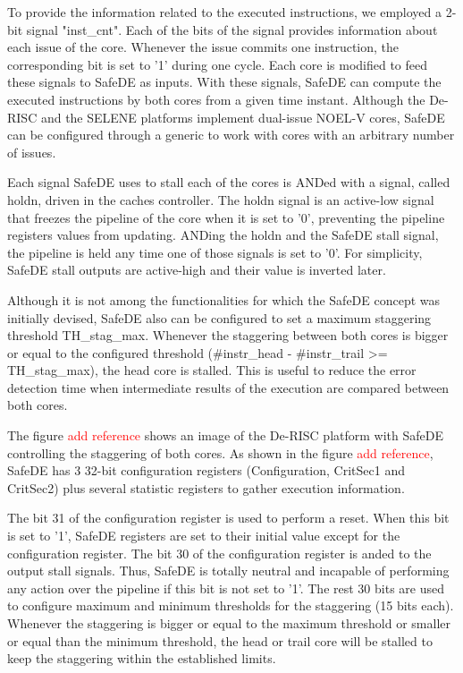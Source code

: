 To provide the information related to the executed instructions, we employed a 2-bit signal "inst\_cnt". Each of the bits of the signal provides information about each issue of the core. Whenever the issue commits one instruction, the corresponding bit is set to '1' during one cycle. Each core is modified to feed these signals to SafeDE as inputs. With these signals, SafeDE can compute the executed instructions by both cores from a given time instant. Although the De-RISC and the SELENE platforms implement dual-issue NOEL-V cores, SafeDE can be configured through a generic to work with cores with an arbitrary number of issues. 

Each signal SafeDE uses to stall each of the cores is ANDed with a signal, called holdn, driven in the caches controller. The holdn signal is an active-low signal that freezes the pipeline of the core when it is set to '0', preventing the pipeline registers values from updating. ANDing the holdn and the SafeDE stall signal, the pipeline is held any time one of those signals is set to '0'. For simplicity, SafeDE stall outputs are active-high and their value is inverted later. 

Although it is not among the functionalities for which the SafeDE concept was initially devised, SafeDE also can be configured to set a maximum staggering threshold TH\_stag\_max. Whenever the staggering between both cores is bigger or equal to the configured threshold (\#instr\_head - \#instr\_trail >= TH\_stag\_max), the head core is stalled. This is useful to reduce the error detection time when intermediate results of the execution are compared between both cores.

The figure \textcolor{red}{add reference} shows an image of the De-RISC platform with SafeDE controlling the staggering of both cores. As shown in the figure \textcolor{red}{add reference}, SafeDE has 3 32-bit configuration registers (Configuration, CritSec1 and CritSec2) plus several statistic registers to gather execution information.

The bit 31 of the configuration register is used to perform a reset. When this bit is set to '1', SafeDE registers are set to their initial value except for the configuration register. The bit 30 of the configuration register is anded to the output stall signals. Thus, SafeDE is totally neutral and incapable of performing any action over the pipeline if this bit is not set to '1'. The rest 30 bits are used to configure maximum and minimum thresholds for the staggering (15 bits each). Whenever the staggering is bigger or equal to the maximum threshold or smaller or equal than the minimum threshold, the head or trail core will be stalled to keep the staggering within the established limits.  


